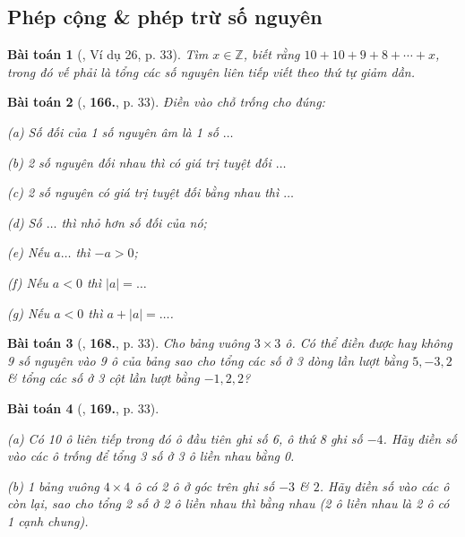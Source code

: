 \documentclass{article}
\numberwithin{equation}{section}
\newtheorem{baitoan}{Bài toán}[section]
\begin{document}
\subsection{Phép cộng \& phép trừ số nguyên}
\begin{baitoan}[\cite{Binh_Toan_6_tap_1}, Ví dụ 26, p. 33]
	Tìm $x\in\mathbb{Z}$, biết rằng $10 + 10 + 9 + 8 + \cdots + x$, trong đó vế phải là tổng các số nguyên liên tiếp viết theo thứ tự giảm dần.
\end{baitoan}

\begin{baitoan}[\cite{Binh_Toan_6_tap_1}, \textbf{166.}, p. 33]
	Điền vào chỗ trống cho đúng:
	\begin{enumerate*}
		\item[(a)] Số đối của 1 số nguyên âm là 1 số $\ldots$
		\item[(b)] 2 số nguyên đối nhau thì có giá trị tuyệt đối $\ldots$
		\item[(c)] 2 số nguyên có giá trị tuyệt đối bằng nhau thì $\ldots$
		\item[(d)] Số $\ldots$ thì nhỏ hơn số đối của nó;
		\item[(e)] Nếu $a\ldots$ thì $-a > 0$;
		\item[(f)] Nếu $a < 0$ thì $|a| = \ldots$
		\item[(g)] Nếu $a < 0$ thì $a + |a| = \ldots$.
	\end{enumerate*}
\end{baitoan}

\begin{baitoan}[\cite{Binh_Toan_6_tap_1}, \textbf{168.}, p. 33]
	Cho bảng vuông $3\times 3$ ô. Có thể điền được hay không 9 số nguyên vào 9 ô của bảng sao cho tổng các số ở 3 dòng lần lượt bằng $5,-3,2$ \& tổng các số ở 3 cột lần lượt bằng $-1,2,2$?
\end{baitoan}	

\begin{baitoan}[\cite{Binh_Toan_6_tap_1}, \textbf{169.}, p. 33]
	\begin{enumerate*}
		\item[(a)] Có 10 ô liên tiếp trong đó ô đầu tiên ghi số 6, ô thứ 8 ghi số $-4$. Hãy điền số vào các ô trống để tổng 3 số ở 3 ô liền nhau bằng 0.
		\item[(b)] 1 bảng vuông $4\times 4$ ô có 2 ô ở góc trên ghi số $-3$ \& $2$. Hãy điền số vào các ô còn lại, sao cho tổng 2 số ở 2 ô liền nhau thì bằng nhau (2 ô liền nhau là 2 ô có 1 cạnh chung).
	\end{enumerate*}
\end{baitoan}
\end{document}
